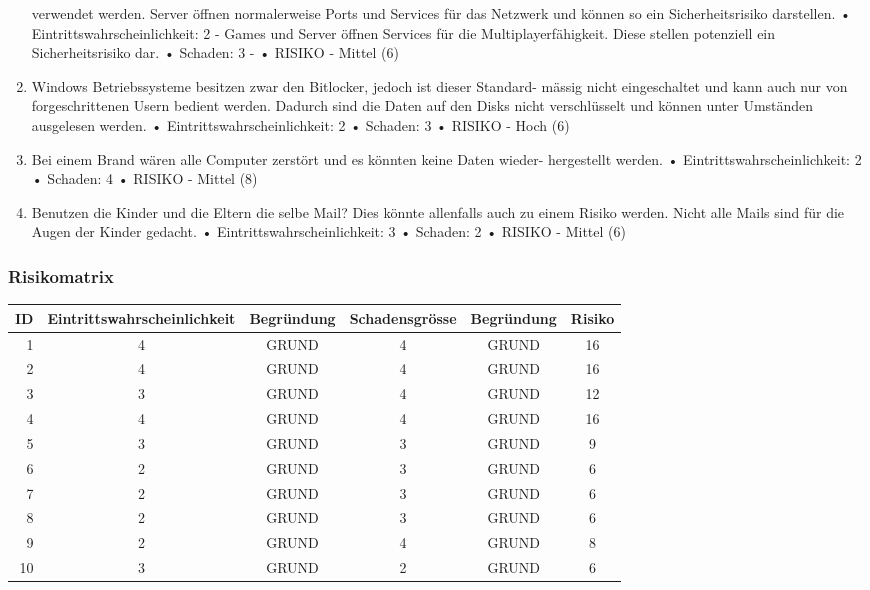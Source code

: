 \documentclass{article}
\newcommand*{\thead}[1]{\multicolumn{1}{c}{\bfseries #1}}
\begin{document}
\begin{enumerate}
verwendet werden. Server öffnen normalerweise Ports und Services für das Netzwerk
und können so ein Sicherheitsrisiko darstellen.
• Eintrittswahrscheinlichkeit: 2 - Games und Server öffnen Services für die
Multiplayerfähigkeit. Diese stellen potenziell ein Sicherheitsrisiko dar.
• Schaden: 3 -
• RISIKO - Mittel (6)
\item Windows Betriebssysteme besitzen zwar den Bitlocker, jedoch ist dieser Standard-
mässig nicht eingeschaltet und kann auch nur von forgeschrittenen Usern bedient
werden. Dadurch sind die Daten auf den Disks nicht verschlüsselt und können unter
Umständen ausgelesen werden.
• Eintrittswahrscheinlichkeit: 2
• Schaden: 3
• RISIKO - Hoch (6)
\item Bei einem Brand wären alle Computer zerstört und es könnten keine Daten wieder-
hergestellt werden.
• Eintrittswahrscheinlichkeit: 2
• Schaden: 4
• RISIKO - Mittel (8)
\item Benutzen die Kinder und die Eltern die selbe Mail? Dies könnte allenfalls auch zu
einem Risiko werden. Nicht alle Mails sind für die Augen der Kinder gedacht.
• Eintrittswahrscheinlichkeit: 3
• Schaden: 2
• RISIKO - Mittel (6)
\end{enumerate}
\newpage
\begin{landscape}
\subsubsection{Risikomatrix}

\begin{tabular}{|r|c|c|c|c|c|}
	\hline
	\thead{ID} & \thead{Eintrittswahrscheinlichkeit} & \thead{Begründung} & \thead{Schadensgrösse} & \thead{Begründung} & \thead{Risiko} \\ \hline
	1 &  \cellcolor{red}4 & GRUND & \cellcolor{red}4 & GRUND  & \cellcolor{red}16 \\ \hline
	2 &  \cellcolor{red}4 & GRUND  & \cellcolor{red}4 & GRUND  & \cellcolor{red}16 \\ \hline
	3 &  \cellcolor{orange}3 & GRUND  & \cellcolor{green}4 & GRUND  & \cellcolor{yellow}12 \\ \hline
	4 &  \cellcolor{red}4 & GRUND  & \cellcolor{red}4 & GRUND  & \cellcolor{red}16 \\ \hline
	5 &  \cellcolor{red}3 & GRUND  & \cellcolor{red}3 & GRUND  & \cellcolor{red}9 \\ \hline
	6 &  \cellcolor{red}2 & GRUND  & \cellcolor{red}3 & GRUND  & \cellcolor{red}6 \\ \hline
	7 &  \cellcolor{red}2 & GRUND  & \cellcolor{red}3 & GRUND  & \cellcolor{red}6 \\ \hline
	8 &  \cellcolor{red}2 & GRUND  & \cellcolor{red}3 & GRUND  & \cellcolor{red}6 \\ \hline
	9 &  \cellcolor{red}2 & GRUND  & \cellcolor{red}4 & GRUND  & \cellcolor{red}8 \\ \hline
	10 &  \cellcolor{red}3 & GRUND  & \cellcolor{red}2 & GRUND  & \cellcolor{red}6 \\ \hline
\end{tabular}

\newpage

\end{landscape}
\end{document}
